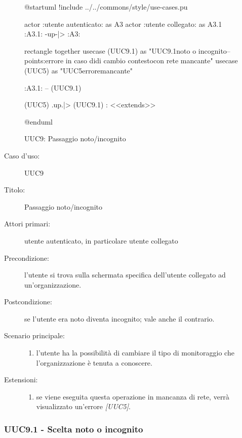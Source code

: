 \documentclass[../../../analisi-dei-requisiti.tex]{subfiles}
\begin{document}
\begin{figure}[h!]
  \centering
  \begin{plantuml}
  @startuml
  !include ../../commons/style/use-cases.pu

  actor :utente autenticato: as A3
  actor :utente collegato: as A3.1
  :A3.1: -up-|> :A3:

  rectangle {
    together {
      usecase (UUC9.1) as "UUC9.1\nScelta noto o incognito\n--\nExtension points:\nVisualizzazione errore in caso di\noperazione di cambio contesto\n con rete mancante"
      usecase (UUC5) as "UUC5\nVisualizzazione errore\nrete mancante"
    }
  }

  :A3.1: -- (UUC9.1)

  (UUC5) .up.|> (UUC9.1) : <<extends>>

  @enduml
  \end{plantuml}
  \caption{UUC9: Passaggio noto/incognito}
  \label{fig:uuc9}
\end{figure}

\begin{description}
  \item[Caso d’uso:] UUC9
  \item[Titolo:] Passaggio noto/incognito
  \item[Attori primari:] utente autenticato, in particolare utente collegato
  \item[Precondizione:] l'utente si trova sulla schermata specifica dell'utente collegato ad un'organizzazione.
  \item[Postcondizione:] se l'utente era noto diventa incognito; vale anche il contrario.
  \item[Scenario principale:]
        \begin{enumerate}
          \item l'utente ha la possibilità di cambiare il tipo di monitoraggio che l'organizzazione è tenuta a conoscere.
        \end{enumerate}
  \item[Estensioni:]
        \begin{enumerate}
          \item se viene eseguita questa operazione in mancanza di rete, verrà visualizzato un'errore \emph{[UUC5]}.
        \end{enumerate}
\end{description}

\subsubsection{UUC9.1 - Scelta noto o incognito}%
\label{subs:UUC9.1}
\end{document}

